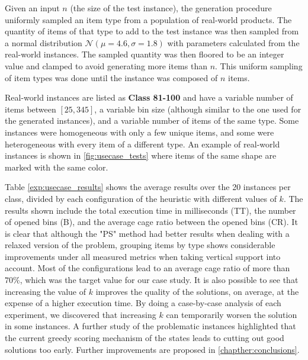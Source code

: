 Given an input $n$ (the size of the test instance), the generation procedure uniformly sampled an item type from a population of real-world products.
The quantity of items of that type to add to the test instance was then sampled from a normal distribution $\mathcal{N}(\mu = 4.6, \sigma = 1.8)$ with parameters calculated from the real-world instances.
The sampled quantity was then floored to be an integer value and clamped to avoid generating more items than $n$.
This uniform sampling of item types was done until the instance was composed of $n$ items.

Real-world instances are listed as \textbf{Class 81-100} and have a variable number of items between $[25, 345]$, a variable bin size (although similar to the one used for the generated instances), and a variable number of items of the same type. Some instances were homogeneous with only a few unique items, and some were heterogeneous with every item of a different type.
An example of real-world instances is shown in \cref{fig:usecase_tests} where items of the same shape are marked with the same color.

Table \ref{exp:usecase_results} shows the average results over the 20 instances per class, divided by each configuration of the heuristic with different values of $k$.
The results shown include the total execution time in milliseconds (TT), the number of opened bins (B), and the average cage ratio between the opened bins (CR).
It is clear that although the "PS" method had better results when dealing with a relaxed version of the problem, grouping items by type shows considerable improvements under all measured metrics when taking vertical support into account.
Most of the configurations lead to an average cage ratio of more than $70\%$, which was the target value for our case study. %
It is also possible to see that increasing the value of $k$ improves the quality of the solutions, on average, at the expense of a higher execution time.
By doing a case-by-case analysis of each experiment, we discovered that increasing $k$ can temporarily worsen the solution in some instances.
A further study of the problematic instances highlighted that the current greedy scoring mechanism of the states leads to cutting out good solutions too early. %
Further improvements are proposed in \cref{chapther:conclusions}.
\label{exp:usecase_results}

